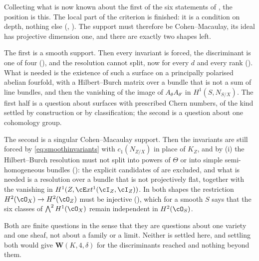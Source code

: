 \begin{remark}\label{rem:routemap}
Collecting what is now known about the first of the six statements of
, the position is this. The local part of the criterion
is finished: it is a condition on depth, nothing else
(, ). The support must therefore
be Cohen--Macaulay, its ideal has projective dimension one, and there are
exactly two shapes left.

The first is a smooth support. Then every invariant is forced, the
discriminant is one of four (), and the resolution
cannot split, now for every $d$ and every rank (). What is
needed is the existence of
such a surface on a principally polarised abelian fourfold, with a
Hilbert--Burch matrix over a bundle that is not a sum of line bundles, and
then the vanishing of the image of $A_{\theta}A_{\theta'}$ in
$H^{1}(S,N_{S/X})$. The first half is a question about surfaces with
prescribed Chern numbers, of the kind settled by construction or by
classification; the second is a question about one cohomology group.

The second is a singular Cohen--Macaulay support. Then the invariants are
still forced by \eqref{eq:smoothinvariants} with $c_{1}(N_{Z/X})$ in place of
$K_{Z}$, and by (i) the Hilbert--Burch resolution
must not split into powers of $\Theta$ or into simple semi-homogeneous
bundles (): the explicit candidates of 
are excluded, and what is needed is a resolution over a bundle that is not
projectively flat, together with the vanishing in
$H^{1}(Z,\cE xt^{1}(\cI_{Z},\cI_{Z}))$. In both shapes the restriction
$H^{2}(\cO_{X})\to H^{2}(\cO_{Z})$ must be injective
(), which for a smooth $S$ says that the six classes
of $\bigwedge^{2}H^{1}(\cO_{X})$ remain independent in $H^{2}(\cO_{S})$.

Both are finite questions in the sense that they are questions about one
variety and one sheaf, not about a family or a limit. Neither is settled here,
and settling both would give $\mathbf{W}(K,4,\delta)$ for the discriminants
reached and nothing beyond them.
\end{remark}
